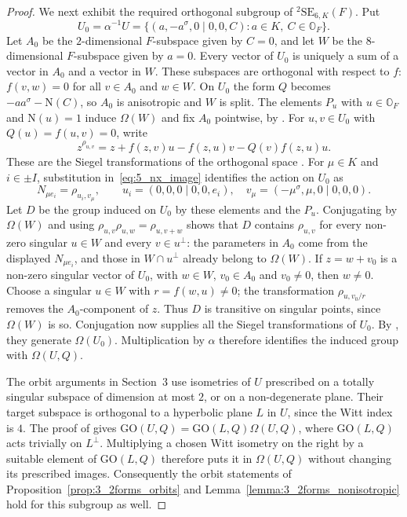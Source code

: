 \documentclass{amsart}
\def\NN{\mathord{\mathrm{N}}}
\def\OO{\mathord{\mathbb{O}}}
\newcommand{\GO}{\mathrm{GO}}
\newcommand{\SE}{\mathrm{SE}}
\newcommand{\s}{\sigma}
\theoremstyle{plain}
\numberwithin{theorem}{section}
\theoremstyle{definition}
\begin{document}
\begin{proof}
	We next exhibit the required orthogonal subgroup of $ {}^2\SE_{6,K}(F)$.
	Put
	\[
		U_0=\alpha^{-1}U
		=\{(a,-a^{\s},0\mid0,0,C):a\in K,\ C\in\OO_F\}.
	\]
	Let $A_0$ be the $2$-dimensional $F$-subspace given by $C=0$,
	and let $W$ be the $8$-dimensional $F$-subspace given by $a=0$.
	Every vector of $U_0$ is uniquely a sum of a vector in $A_0$ and a
	vector in $W$. These subspaces are orthogonal with respect to $f$:
	$f(v,w)=0$ for all $v\in A_0$ and $w\in W$. On $U_0$ the form $Q$ becomes
	$-aa^{\s}-\NN(C)$, so $A_0$ is anisotropic and $W$ is split.
	The elements $P_u$ with $u\in\OO_F$ and $\NN(u)=1$ induce
	$\Omega(W)$ and fix $A_0$ pointwise, by \cite[Section~6]{BSW1}.
	For $u,v\in U_0$ with $Q(u)=f(u,v)=0$, write
	\[
		z^{\rho_{u,v}}=
		z+f(z,v)u-f(z,u)v-Q(v)f(z,u)u.
	\]
	These are the Siegel transformations of the orthogonal space
	\cite[Section~11]{Taylor}. For $\mu\in K$ and $i\in\pm I$,
	substitution in~\eqref{eq:5_nx_image} identifies the action on $U_0$ as
	\[
		N_{\mu e_i}=\rho_{u_i,v_\mu},\qquad
		u_i=(0,0,0\mid0,0,e_i),\quad
		v_\mu=(-\mu^{\s},\mu,0\mid0,0,0).
	\]
	Let $D$ be the group induced on $U_0$ by these elements and the $P_u$.
	Conjugating by $\Omega(W)$ and using
	$\rho_{u,v}\rho_{u,w}=\rho_{u,v+w}$ shows that $D$ contains
	$\rho_{u,v}$ for every non-zero singular $u\in W$ and every $v\in u^\perp$:
	the parameters in $A_0$ come from the displayed $N_{\mu e_i}$,
	and those in $W\cap u^\perp$ already belong to $\Omega(W)$.
	If $z=w+v_0$ is a non-zero singular vector of $U_0$, with
	$w\in W$, $v_0\in A_0$ and $v_0\neq0$, then $w\neq0$.
	Choose a singular $u\in W$ with $r=f(w,u)\neq0$;
	the transformation $\rho_{u,v_0/r}$ removes the $A_0$-component of $z$.
	Thus $D$ is transitive on singular points, since $\Omega(W)$ is so.
	Conjugation now supplies all the Siegel transformations of $U_0$.
	By \cite[Theorem~11.46]{Taylor}, they generate $\Omega(U_0)$.
	Multiplication by $\alpha$ therefore identifies the induced group
	with $\Omega(U,Q)$.

	The orbit arguments in Section~3 use isometries of $U$ prescribed on
	a totally singular subspace of dimension at most $2$, or on a
	non-degenerate plane. Their target subspace is orthogonal to a
	hyperbolic plane $L$ in $U$, since the Witt index is $4$.
	The proof of \cite[Theorem~11.46]{Taylor} gives
	$\GO(U,Q)=\GO(L,Q)\Omega(U,Q)$, where $\GO(L,Q)$ acts trivially on
	$L^\perp$. Multiplying a chosen Witt isometry on the right by a
	suitable element of $\GO(L,Q)$ therefore puts it in $\Omega(U,Q)$
	without changing its prescribed images. Consequently the orbit
	statements of Proposition~\ref{prop:3_2forms_orbits} and
	Lemma~\ref{lemma:3_2forms_nonisotropic} hold for this subgroup as well.


\end{proof}
\end{document}
